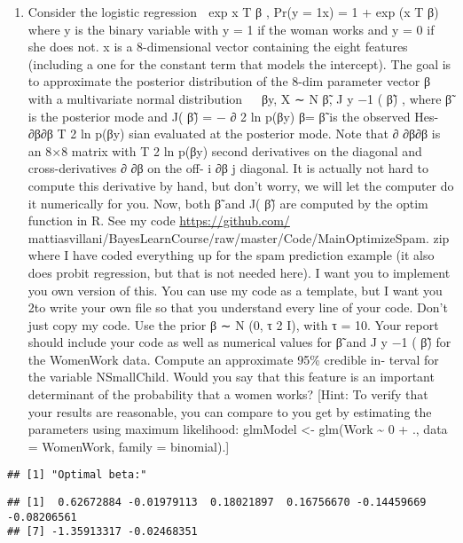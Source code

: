 \documentclass[]{article}
\providecommand{\tightlist}{%
  \setlength{\itemsep}{0pt}\setlength{\parskip}{0pt}}
\begin{document}
\begin{enumerate}
\def\labelenumi{(\alph{enumi})}
\tightlist
\item
  Consider the logistic regression  exp x T β , Pr(y = 1\textbar{}x) =
  1 + exp (x T β) where y is the binary variable with y = 1 if the woman
  works and y = 0 if she does not. x is a 8-dimensional vector
  containing the eight features (including a one for the constant term
  that models the intercept). The goal is to approximate the posterior
  distribution of the 8-dim parameter vector β with a multivariate
  normal distribution   β\textbar{}y, X ∼ N β̃, J y −1 ( β̃) , where β̃
  is the posterior mode and J( β̃) = − ∂ 2 ln p(β\textbar{}y) \textbar{}
  β= β̃ is the observed Hes- ∂β∂β T 2 ln p(β\textbar{}y) sian evaluated
  at the posterior mode. Note that ∂ ∂β∂β is an 8×8 matrix with T 2 ln
  p(β\textbar{}y) second derivatives on the diagonal and
  cross-derivatives ∂ ∂β on the off- i ∂β j diagonal. It is actually not
  hard to compute this derivative by hand, but don't worry, we will let
  the computer do it numerically for you. Now, both β̃ and J( β̃) are
  computed by the optim function in R. See my code
  \url{https://github.com/}
  mattiasvillani/BayesLearnCourse/raw/master/Code/MainOptimizeSpam. zip
  where I have coded everything up for the spam prediction example (it
  also does probit regression, but that is not needed here). I want you
  to implement you own version of this. You can use my code as a
  template, but I want you 2to write your own file so that you
  understand every line of your code. Don't just copy my code. Use the
  prior β ∼ N (0, τ 2 I), with τ = 10. Your report should include your
  code as well as numerical values for β̃ and J y −1 ( β̃) for the
  WomenWork data. Compute an approximate 95\% credible in- terval for
  the variable NSmallChild. Would you say that this feature is an
  important determinant of the probability that a women works? {[}Hint:
  To verify that your results are reasonable, you can compare to you get
  by estimating the parameters using maximum likelihood: glmModel
  \textless{}- glm(Work \textasciitilde{} 0 + ., data = WomenWork,
  family = binomial).{]}
\end{enumerate}

\begin{verbatim}
## [1] "Optimal beta:"
\end{verbatim}

\begin{verbatim}
## [1]  0.62672884 -0.01979113  0.18021897  0.16756670 -0.14459669 -0.08206561
## [7] -1.35913317 -0.02468351
\end{verbatim}
\end{document}
